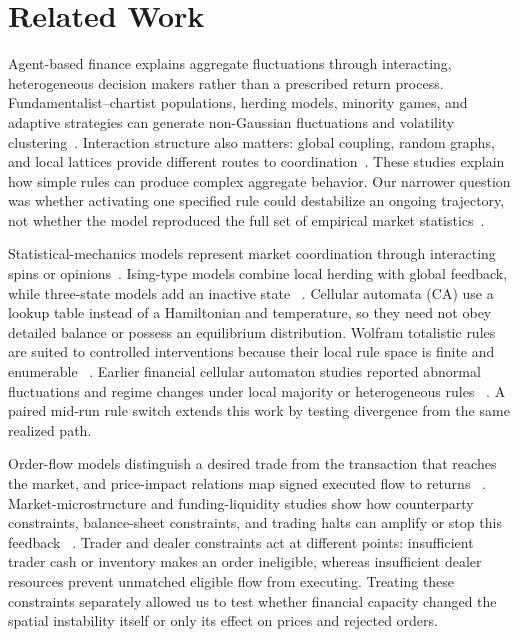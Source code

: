 \section{Related Work}

Agent-based finance explains aggregate fluctuations through interacting,
heterogeneous decision makers rather than a prescribed return process.
Fundamentalist--chartist populations, herding models, minority games, and
adaptive strategies can generate non-Gaussian fluctuations and volatility
clustering~\cite{lux1999scaling,cont2000herd,challet1997minority,
farmer2002price,hommes2006heterogeneous}. Interaction structure also matters:
global coupling, random graphs, and local lattices provide different routes to
coordination~\cite{lebaron2006agent,battiston2016complexity}. These studies
explain how simple rules can produce complex aggregate behavior. Our narrower
question was whether activating one specified rule could destabilize an ongoing
trajectory, not whether the model reproduced the full set of empirical market
statistics~\cite{cont2001empirical}.

Statistical-mechanics models represent market coordination through interacting
spins or opinions~\cite{chowdhury2000statistical,sznajd2002simple}. Ising-type
models combine local herding with global feedback,
while three-state models add an inactive state
~\cite{bornholdt2001ising,krawiecki2002volatility,kaizoji2002speculative}.
Cellular automata (CA) use a lookup table instead of a Hamiltonian and
temperature, so they need not obey detailed balance or possess an equilibrium
distribution. Wolfram totalistic rules are suited to controlled interventions because their
local rule space is finite and enumerable
~\cite{wolfram1984universality,wolfram2002new,packard1985two}. Earlier financial
cellular automaton studies reported abnormal fluctuations and regime changes under local
majority or heterogeneous rules
~\cite{wei2003cellular,bartolozzi2004stochastic,qiu2007cellular,fan2009effect,atman2012influence}. A paired mid-run rule
switch extends this work by testing divergence from the same realized path.

Order-flow models distinguish a desired trade from the transaction that reaches
the market, and price-impact relations map signed executed flow to returns
~\cite{kyle1985continuous,gabaix2003theory,farmer2005predictive}.
Market-microstructure and funding-liquidity studies show how counterparty
constraints, balance-sheet constraints, and trading halts can amplify or stop
this feedback
~\cite{subrahmanyam1994circuit,brunnermeier2009market,kirilenko2017flash}. Trader and dealer constraints
act at different points: insufficient trader cash or inventory makes an order
ineligible, whereas insufficient dealer resources prevent unmatched eligible
flow from executing. Treating these constraints separately allowed us to test
whether financial capacity changed the spatial instability itself or only its
effect on prices and rejected orders.
